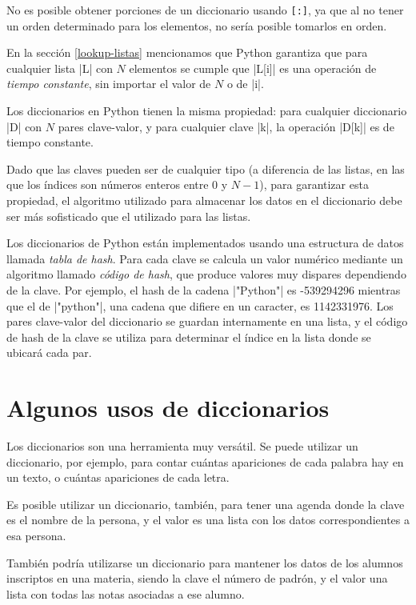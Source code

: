 No es posible obtener porciones de un diccionario usando \lstinline![:]!,
ya que al no tener un orden determinado para los elementos, no sería
posible tomarlos en orden.

\begin{sabias_que}
En la sección \ref{lookup-listas} mencionamos que Python garantiza que para
cualquier lista |L| con $N$ elementos se cumple que |L[i]| es una operación de
\emph{tiempo constante}, sin importar el valor de $N$ o de |i|.

Los diccionarios en Python tienen la misma propiedad: para cualquier
diccionario |D| con $N$ pares clave-valor, y para cualquier clave |k|, la
operación |D[k]| es de tiempo constante.

Dado que las claves pueden ser de cualquier tipo (a diferencia de las listas, en
las que los índices son números enteros entre 0 y $N-1$), para garantizar esta
propiedad, el algoritmo utilizado para almacenar los datos en el diccionario
debe ser más sofisticado que el utilizado para las listas.

Los diccionarios de Python están implementados usando una estructura de datos
llamada \emph{tabla de hash}. Para cada clave se calcula un valor numérico
mediante un algoritmo llamado \emph{código de hash}, que produce valores
muy dispares dependiendo de la clave.  Por ejemplo, el hash de la cadena
|"Python"| es -539294296 mientras que el de |"python"|, una cadena que
difiere en un caracter, es 1142331976. Los pares clave-valor del diccionario
se guardan internamente en una lista, y el código de hash de la clave se
utiliza para determinar el índice en la lista donde se ubicará cada par.
\end{sabias_que}

\section{Algunos usos de diccionarios}

Los diccionarios son una herramienta muy versátil.  Se puede utilizar un
diccionario, por ejemplo, para contar cuántas apariciones de cada palabra
hay en un texto, o cuántas apariciones de cada letra.

Es posible utilizar un diccionario, también, para tener una agenda donde la
clave es el nombre de la persona, y el valor es una lista con los datos
correspondientes a esa persona.

También podría utilizarse un diccionario para mantener los datos de los
alumnos inscriptos en una materia, siendo la clave el número de padrón, y
el valor una lista con todas las notas asociadas a ese alumno.

